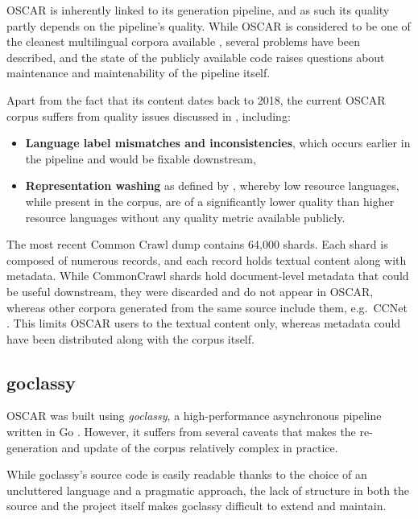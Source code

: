 OSCAR is inherently linked to its generation pipeline, and as such its quality partly depends on the pipeline's quality. While OSCAR is considered to be one of the cleanest multilingual corpora available \citep{caswell-etal-2020-language,caswell-etal-2021-quality}, several problems have been described, and the state of the publicly available code raises questions about maintenance and maintenability of the pipeline itself.

Apart from the fact that its content dates back to 2018, the current OSCAR corpus suffers from quality issues discussed in \citep{caswell-etal-2020-language,caswell-etal-2021-quality}, including:

\begin{itemize}
    \item \textbf{Language label mismatches and inconsistencies}, which occurs earlier in the pipeline and would be fixable downstream,
    \item \textbf{Representation washing} as defined by \citet{caswell-etal-2021-quality}, whereby low resource languages, while present in the corpus, are of a significantly lower quality than higher resource languages without any quality metric available publicly.
\end{itemize}

The most recent Common Crawl dump contains 64,000 shards. Each shard is composed of numerous records, and each record holds textual content along with metadata. While CommonCrawl shards hold document-level metadata that could be useful downstream, they were discarded and do not appear in OSCAR, whereas other corpora generated from the same source include them, e.g.~CCNet \citep{wenzek-etal-2020-ccnet}. This limits OSCAR users to the textual content only, whereas metadata could have been distributed along with the corpus itself.

\subsection{goclassy}

OSCAR was built using \emph{goclassy}, a high-performance asynchronous pipeline written in Go \citep{ortiz-suarez-etal-2019-asynchronous}. However, it suffers from several caveats that makes the re-generation and update of the corpus relatively complex in practice.

While goclassy's source code is easily readable thanks to the choice of an uncluttered language and a pragmatic approach, the lack of structure in both the source and the project itself makes goclassy difficult to extend and maintain.

